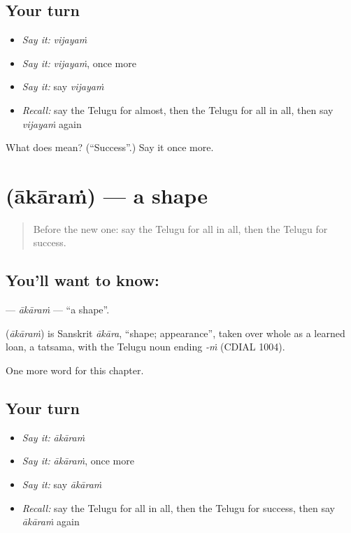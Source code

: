 \subsection*{Your turn}
\begin{itemize}
\raggedright
  \item \emph{Say it:} \emph{vijayaṁ}
  \item \emph{Say it:} \emph{vijayaṁ}, once more
  \item \emph{Say it:} say \emph{vijayaṁ}
  \item \emph{Recall:} say the Telugu for almost, then the Telugu for all in all, then say \emph{vijayaṁ} again
\end{itemize}

\begin{tcolorbox}[breakable,colback=teal!4,colframe=teal!35!black,title={Before you move on}]
What does  mean? (\textquotedblleft{}Success\textquotedblright{}.) Say it once more.
\end{tcolorbox}
\section[\texorpdfstring{\te{ఆకారం} (ākāraṁ)}{ఆకారం (ākāraṁ)}]{ (ākāraṁ) — a shape}

\label{lesson:TE-C295-akaram}



\begin{quote}
Before the new one: say the Telugu for all in all, then the Telugu for success.
\end{quote}

\subsection*{You'll want to know: }
\textbf{} — \emph{ākāraṁ} — \textquotedblleft{}a shape\textquotedblright{}.

\begin{cousinweb}
\textbf{} (\emph{ākāraṁ}) is Sanskrit \emph{ākāra}, \textquotedblleft{}shape; appearance\textquotedblright{}, taken over whole as a learned loan, a tatsama, with the Telugu noun ending \emph{-ṁ} (CDIAL 1004).
\end{cousinweb}

\begin{grammarlens}[title={What you've built}]
One more word for this chapter.
\end{grammarlens}

\subsection*{Your turn}
\begin{itemize}
\raggedright
  \item \emph{Say it:} \emph{ākāraṁ}
  \item \emph{Say it:} \emph{ākāraṁ}, once more
  \item \emph{Say it:} say \emph{ākāraṁ}
  \item \emph{Recall:} say the Telugu for all in all, then the Telugu for success, then say \emph{ākāraṁ} again
\end{itemize}

